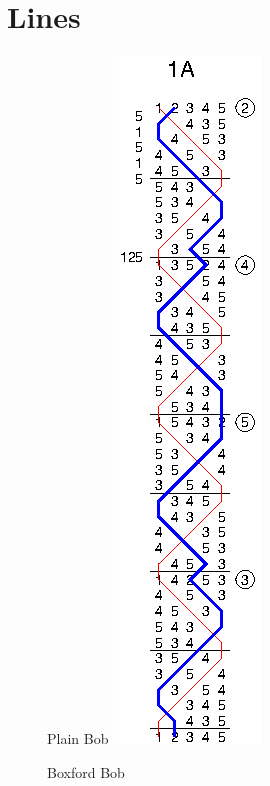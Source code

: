 \chapter{Lines} \label{cha:lines}

\begin{figure}[t]
  \centering
  \begin{minipage}[t]{0.24\textwidth}
    \centering
    Plain Bob
    \includegraphics{figs/methods/single-hunt/1A}
  \end{minipage}
  \begin{minipage}[t]{0.24\textwidth}
    \centering
    Boxford Bob

\end{minipage}
\end{figure}
